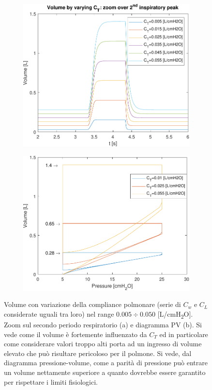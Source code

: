 \begin{figure}[t!]
	\begin{subfigure}{0.5\linewidth}
	\centering
	\includegraphics[width=0.95\linewidth]{../model/data_log/CwCL_volume_zoom.pdf}
	\caption{}
\end{subfigure}\hfill
	\begin{subfigure}{0.5\linewidth}
	\centering
	\includegraphics[width=0.95\linewidth]{../model/data_log/CwCL_PV.pdf}
	\caption{}
\end{subfigure}\hfill
	\caption{Volume con variazione della compliance polmonare (serie di $C_w$ e $C_L$ considerate uguali tra loro) nel range $0.005\div 0.050$ [L/cmH\textsubscript{2}O]. Zoom sul secondo periodo respiratorio (a) e diagramma PV (b). Si vede come il volume è fortemente influenzato da $C_T$ ed in particolare come considerare valori troppo alti porta ad un ingresso di volume elevato che può risultare pericoloso per il polmone. Si vede, dal diagramma pressione-volume, come a parità di pressione può entrare un volume nettamente superiore a quanto dovrebbe essere garantito per rispettare i limiti fisiologici. }
\end{figure}

